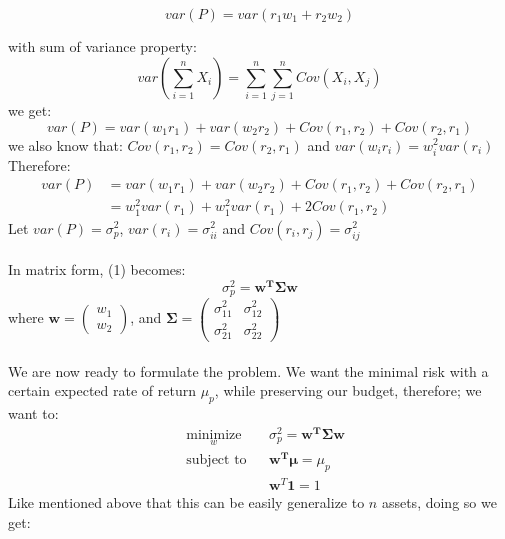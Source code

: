 \documentclass[12pt,titlepage,a4paper]{article}
\begin{document}
$$
var(P) = var(r_1w_1 + r_2w_2)
$$

with sum of variance property: $$var(\sum_{i=1}^{n}{X_i}) = \sum_{i=1}^n\sum_{j=1}^{n}{Cov(X_i,X_j)}$$
we get: 
$$
var(P) = var(w_1r_1)+var(w_2r_2)+Cov(r_1,r_2)+Cov(r_2,r_1)
$$
we also know that: $Cov(r_1,r_2) = Cov(r_2,r_1)$ and $var(w_ir_i)=w_i^2var(r_i)$ \\
Therefore: 
\begin{equation}
\begin{split}
var(P) &= var(w_1r_1)+var(w_2r_2)+Cov(r_1,r_2)+Cov(r_2,r_1)\\
&= w_1^2var(r_1) + w_1^2var(r_1) + 2Cov(r_1,r_2)
\end{split}
\end{equation}
Let $var(P)=\sigma_p^2$, $var(r_i)=\sigma_{ii}^2$ and $Cov(r_i,r_j)=\sigma_{ij}^2$ \\ \\
In matrix form, (1) becomes: 
\begin{equation*}
\sigma_p^2 = \mathbf{w^T\Sigma w}
\end{equation*}
where $\mathbf{w} = \begin{pmatrix} w_1 \\ w_2 \end{pmatrix}$, and $\mathbf{\Sigma} = \begin{pmatrix}\sigma_{11}^2 & \sigma_{12}^2 \\ \sigma_{21}^2 & \sigma_{22}^2 \end{pmatrix}$ \\ \\ 
We are now ready to formulate the problem. We want the minimal risk with a certain expected rate of return $\mu_p$, while preserving our budget, therefore; we want to: 
\begin{equation}
\begin{aligned}
& \underset{w}{\text{minimize}}
& &\sigma_p^2 = \mathbf{w^T\Sigma w}\\
& \text{subject to}
& & \mathbf{w^T\mu} = \mu_p \\
&&& \mathbf{w}^T\mathbf{1}=1
\end{aligned}
\end{equation}
Like mentioned above that this can be easily generalize to $n$ assets, doing so we get: 
\end{document}
